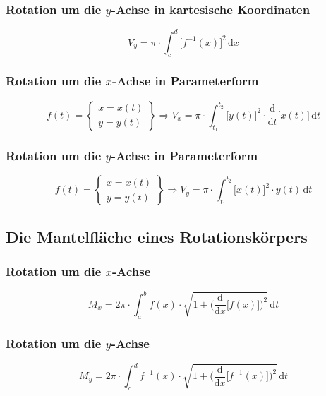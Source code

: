 \subsubsection{Rotation um die $y$-Achse in kartesische Koordinaten}
\begin{equation}
\boxed{V_y=\pi\cdot \displaystyle \int_c^d\Big[f^{-1}\left(x\right)\Big]^2\,\text{d}x}
\end{equation}
\subsubsection{Rotation um die $x$-Achse in Parameterform}
\begin{equation}
\boxed{f\left(t\right)=\left\{\begin{matrix}x=x\left(t\right)\\y=y\left(t\right)\end{matrix}\right\}\Longrightarrow V_x=\pi\cdot \displaystyle \int_{t_1}^{t_2}\Big[y\left(t\right)\Big]^2\cdot \dfrac{\text{d}}{\text{d}t}\Big[x\left(t\right)\Big]\,\text{d}t}
\end{equation}
\subsubsection{Rotation um die $y$-Achse in Parameterform}
\begin{equation}
\boxed{f\left(t\right)=\left\{\begin{matrix}x=x\left(t\right)\\y=y\left(t\right)\end{matrix}\right\}\Longrightarrow V_y=\pi\cdot \displaystyle \int_{t_1}^{t_2}\Big[x\left(t\right)\Big]^2\cdot y\left(t\right)\,\text{d}t}
\end{equation}
\subsection{Die Mantelfläche eines Rotationskörpers}
\subsubsection{Rotation um die $x$-Achse}
\begin{equation}
\boxed{M_x=2\pi\cdot \displaystyle \int_a^b f\left(x\right)\cdot \sqrt{1+\Big(\dfrac{\text{d}}{\text{d}x}\Big[f\left(x\right)\Big]\Big)^2}\,\text{d}t}
\end{equation}
\subsubsection{Rotation um die $y$-Achse}
\begin{equation}
\boxed{M_y=2\pi\cdot \displaystyle \int_c^df^{-1}\left(x\right)\cdot \sqrt{1+\Big(\dfrac{\text{d}}{\text{d}x}\Big[f^{-1}\left(x\right)\Big]\Big)^2}\,\text{d}t}
\end{equation}
